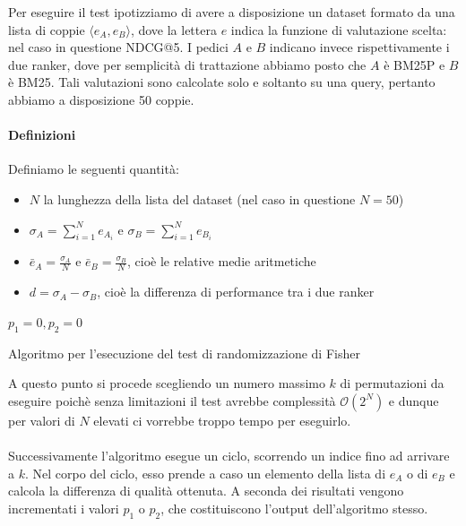 Per eseguire il test ipotizziamo di avere a disposizione un dataset formato da una lista
di coppie $\langle e_{A}, e_{B}\rangle$, dove la lettera $e$ indica la funzione di valutazione
scelta: nel caso in questione NDCG@5. I pedici $A$ e $B$ indicano invece rispettivamente i due
ranker, dove per semplicità di trattazione abbiamo posto che $A$ è BM25P e $B$ è BM25. Tali valutazioni sono calcolate solo e soltanto su una query,
pertanto abbiamo a disposizione 50 coppie.

\paragraph{Definizioni}
Definiamo le seguenti quantità:

\begin{itemize}
	\item $N$ la lunghezza della lista del dataset (nel caso in questione $N=50$)
	\item $\sigma_A = \sum_{i=1}^{N} e_{A_i}$ e $\sigma_B = \sum_{i=1}^{N} e_{B_i}$
	\item $\bar{e}_A = \frac{\sigma_{A} }{N}$ e  $\bar{e}_B = \frac{\sigma_{B} }{N}$, cioè le relative medie aritmetiche
	\item $d = \sigma_{A} - \sigma_{B}$, cioè la differenza di performance tra i due ranker
\end{itemize}


\begin{algorithm}[h!]
	\small
	\DontPrintSemicolon
	\BlankLine
	$p_1 = 0, p_2 = 0$\;
	\BlankLine
	
	\label{alg:spectest}
	\caption{Algoritmo per l'esecuzione del test di randomizzazione di Fisher}
\end{algorithm}

A questo punto si procede scegliendo un numero massimo $k$ di permutazioni
da eseguire poichè  senza limitazioni  il test avrebbe complessità $\mathcal{O}(2^N)$
e dunque per valori di $N$ elevati ci vorrebbe troppo tempo per eseguirlo.
\\
\\
Successivamente l'algoritmo esegue un ciclo, scorrendo un indice fino ad arrivare a $k$.
Nel corpo del ciclo, esso prende a caso un elemento della lista di $e_A$ o di $e_B$ e
calcola la differenza di qualità ottenuta.
A seconda dei risultati vengono incrementati i valori $p_1$ o $p_2$, che costituiscono
l'output dell'algoritmo stesso.

